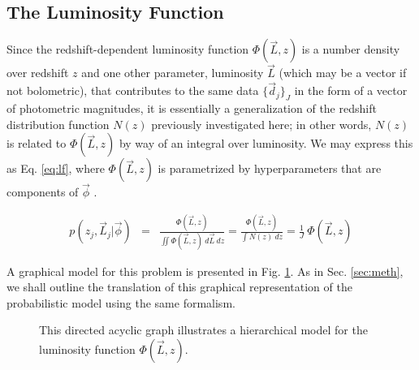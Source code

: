 \documentclass[preprint]{aastex}
\begin{document}
\subsection{The Luminosity Function}
\label{sec:lf}

Since the redshift-dependent luminosity function $\Phi(\vec{L},z)$ is a number density over redshift $z$ and one other parameter, luminosity $\vec{L}$ (which may be a vector if not bolometric), that contributes to the same data $\{\vec{d}_{j}\}_{J}$ in the form of a vector of photometric magnitudes, it is essentially a generalization of the redshift distribution function $N(z)$ previously investigated here; in other words, $N(z)$ is related to $\Phi(\vec{L},z)$ by way of an integral over luminosity.   We may express this as Eq. \ref{eq:lf}, where $\Phi(\vec{L},z)$ is parametrized by hyperparameters that are components of $\vec{\phi}$ .

\begin{eqnarray}
\label{eq:lf}
p(z_{j},\vec{L}_{j}|\vec{\phi}) &=& \frac{\Phi(\vec{L},z)}{\iint \Phi(\vec{L},z)\ d\vec{L}\ dz} = \frac{\Phi(\vec{L},z)}{\int N(z)\ dz} = \frac{1}{J}\ \Phi(\vec{L},z)
\end{eqnarray}

A graphical model for this problem is presented in Fig. \ref{fig:lf}.  As in Sec. \ref{sec:meth}, we shall outline the translation of this graphical representation of the probabilistic model using the same formalism.

\begin{figure}
\vspace{0.5cm}
\begin{center}
\caption{This directed acyclic graph illustrates a hierarchical model for the luminosity function $\Phi(\vec{L},z)$.}
\label{fig:lf}
\end{center}
\end{figure}
\end{document}
